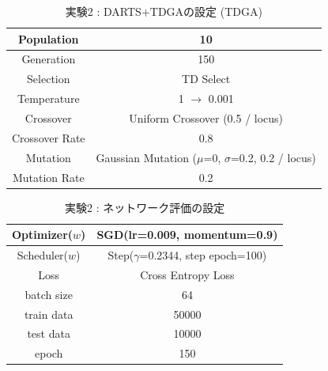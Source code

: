 \begin{table}[t]
  \begin{center}
    \caption{実験2 : DARTS+TDGAの設定 (TDGA)}
  	\vspace{3mm}
    \begin{tabular}{|c|c|} \hline
      Population & 10 \\ \hline
      Generation & 150 \\ \hline \hline
      Selection & TD Select \\ \hline
      Temperature & 1 $\rightarrow$ 0.001 \\ \hline \hline
      Crossover & Uniform Crossover (0.5 / locus) \\ \hline
      Crossover Rate & 0.8 \\ \hline \hline
      Mutation & Gaussian Mutation ($\mu$=0, $\sigma$=0.2, 0.2 / locus)\\ \hline
      Mutation Rate & 0.2 \\ \hline
    \end{tabular}
    \label{tab:setting_ga}
  \end{center}
\end{table}

\begin{table}[t]
  \begin{center}
    \caption{実験2 : ネットワーク評価の設定}
  	\vspace{3mm}
    \begin{tabular}{|c|c|} \hline
      Optimizer($w$) & SGD(lr=0.009, momentum=0.9) \\ \hline
      Scheduler($w$) & Step($\gamma$=0.2344, step epoch=100) \\ \hline
      Loss & Cross Entropy Loss \\ \hline
      batch size & 64 \\ \hline
      train data & 50000\\ \hline
      test data &  10000\\ \hline
      epoch & 150\\ \hline
    \end{tabular}
    \label{tab:setting_eval}
  \end{center}
\end{table}
